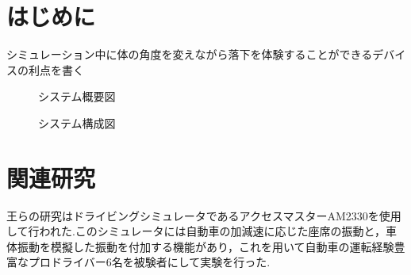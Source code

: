 \documentclass[uplatex]{jsarticle}
\begin{document}
\vspace{3mm}

\setcounter{page}{9}

\section{はじめに}
シミュレーション中に体の角度を変えながら落下を体験することができるデバイスの利点を書く

\begin{figure}[tb]
  \centering
  \caption{システム概要図}
  \label{fig:about_system}
  \caption{システム構成図}
  \label{fig:system_str}
\end{figure}

\section{関連研究}
王らの研究はドライビングシミュレータであるアクセスマスターAM2330を使用して行われた.このシミュレータには自動車の加減速に応じた座席の振動と，車体振動を模擬した振動を付加する機能があり，これを用いて自動車の運転経験豊富なプロドライバー6名を被験者にして実験を行った.
\end{document}
